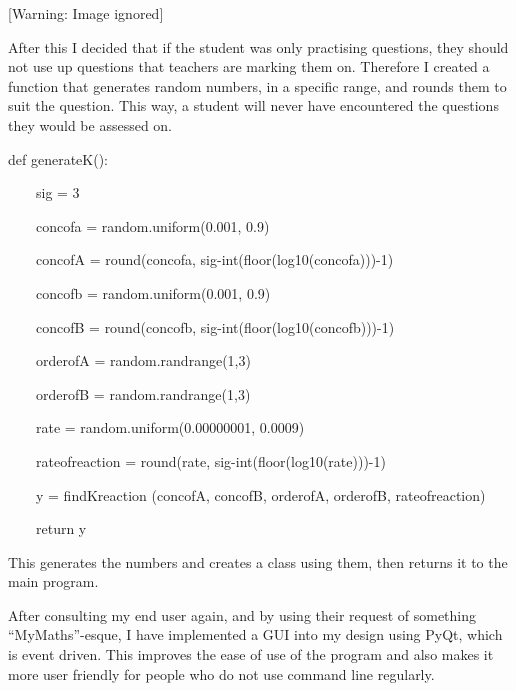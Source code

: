 \documentclass{article}
\begin{document}
  [Warning: Image ignored] %
 

After this I decided that if the student was only practising questions, they should not use up questions that teachers are marking them on. Therefore I created a function that generates random numbers, in a specific range, and rounds them to suit the question. This way, a student will never have encountered the questions they would be assessed on.


\bigskip


\bigskip

def generateK():

\ \ \ \ sig = 3


\bigskip


\bigskip

\ \ \ \ concofa = random.uniform(0.001, 0.9)

\ \ \ \ concofA = round(concofa, sig-int(floor(log10(concofa)))-1)

\ \ \ \ concofb = random.uniform(0.001, 0.9)

\ \ \ \ concofB = round(concofb, sig-int(floor(log10(concofb)))-1)

\ \ \ \ orderofA = random.randrange(1,3)

\ \ \ \ orderofB = random.randrange(1,3)

\ \ \ \ rate = random.uniform(0.00000001, 0.0009)

\ \ \ \ rateofreaction = round(rate, sig-int(floor(log10(rate)))-1)

\ \ \ \ y = findKreaction (concofA, concofB, orderofA, orderofB, rateofreaction)

\ \ \ \ return y


\bigskip


\bigskip

This generates the numbers and creates a class using them, then returns it to the main program.


\bigskip


\bigskip


\bigskip


\bigskip


\bigskip

After consulting my end user again, and by using their request of something ``MyMaths''-esque, I have implemented a GUI into my design using PyQt, which is event driven. This improves the ease of use of the program and also makes it more user friendly for people who do not use command line regularly.
\end{document}
